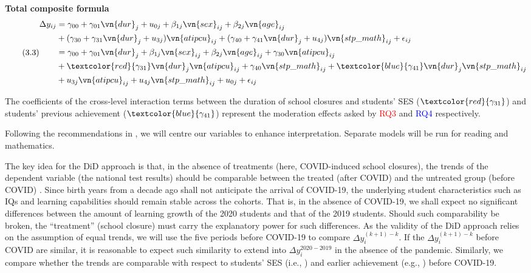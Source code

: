 \noindent\textbf{Total composite formula}
\begin{equation}\label{eqn:33}\tag{3.3}
	\begin{aligned}
		\Delta y_{ij} &= \gamma_{00} + \gamma_{01} \vn{dur}_j + u_{0j} + \beta_{1j} \vn{sex}_{ij} + \beta_{2j} \vn{age}_{ij}\\
            &+ (\gamma_{30} + \gamma_{31} \vn{dur}_j + u_{3j}) \vn{atipcu}_{ij} + (\gamma_{40} + \gamma_{41} \vn{dur}_j + u_{4j}) \vn{stp\_math}_{ij} + \epsilon_{ij}\\
			&= \gamma_{00} + \gamma_{01} \vn{dur}_j + \beta_{1j} \vn{sex}_{ij} + \beta_{2j} \vn{age}_{ij} + \gamma_{30} \vn{atipcu}_{ij}\\
            &+ \textcolor{red}{\gamma_{31}} \vn{dur}_j \vn{atipcu}_{ij} + \gamma_{40} \vn{stp\_math}_{ij} + \textcolor{blue}{\gamma_{41}} \vn{dur}_j \vn{stp\_math}_{ij}\\
            &+ u_{3j} \vn{atipcu}_{ij} + u_{4j} \vn{stp\_math}_{ij} + u_{0j} + \epsilon_{ij}
	\end{aligned}
\end{equation}

The coefficients of the cross-level interaction terms between the duration of school closures and students' SES ($\textcolor{red}{\gamma_{31}}$) and students' previous achievement ($\textcolor{blue}{\gamma_{41}}$) represent the moderation effects asked by \textcolor{red}{RQ3} and \textcolor{blue}{RQ4} respectively.

Following the recommendations in \textcite{enders:2007}, we will centre our variables to enhance interpretation. Separate models will be run for reading and mathematics.

The key idea for the DiD approach is that, in the absence of treatments (here, COVID-induced school closures), the trends of the dependent variable (the national test results) should be comparable between the treated (after COVID) and the untreated group (before COVID) \parencite{angrist:2009}. Since birth years from a decade ago shall not anticipate the arrival of COVID-19, the underlying student characteristics such as IQs and learning capabilities should remain stable across the cohorts. That is, in the absence of COVID-19, we shall expect no significant differences between the amount of learning growth of the 2020 students and that of the 2019 students. Should such comparability be broken, the ``treatment'' (school closure) must carry the explanatory power for such differences. As the validity of the DiD approach relies on the assumption of equal trends, we will use the five periods before COVID-19 to compare $\Delta y_i^{(k+1)-k}$. If the $\Delta y_i^{(k+1)-k}$ before COVID are similar, it is reasonable to expect such similarity to extend into $\Delta y_i^{2020-2019}$ in the absence of the pandemic.  Similarly, we compare whether the trends are comparable with respect to students' SES (i.e., ) and earlier achievement (e.g., ) before COVID-19.

